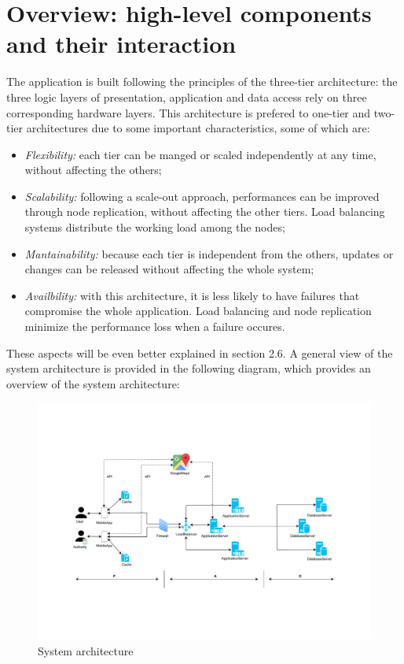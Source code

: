 \documentclass[12pt,a4paper]{report}
\begin{document}
		\section{Overview:	high-level	components	and	their	interaction}
	The application is built following the principles of the three-tier architecture: the three logic layers of presentation, 				application and data access rely on three corresponding hardware layers. This architecture is prefered to one-tier and 			two-tier architectures due to some important characteristics, some of which are:
	\begin{itemize}
	\item \emph{Flexibility:} each tier can be manged or scaled independently at any time, without affecting the others;
	\item \emph{Scalability:} following a scale-out approach, performances can be improved through node replication, without affecting the other tiers.
	Load balancing systems distribute the working load among the nodes;
	\item \emph{Mantainability:} because each tier is independent from the others, updates or changes can be released
	without affecting the whole system;
	\item \emph{Availbility:} with this architecture, it is less likely to have failures that compromise the whole application.
	Load balancing and node replication minimize the performance loss when a failure occures.
	\end{itemize}
	These aspects will be even better explained in section 2.6.
	A general view of the system architecture is provided in the following diagram, which provides an overview of the system architecture:
	\begin{figure}[H]
			\includegraphics[scale = 0.6, center]{sysarch}
			\caption{System architecture}
	\end{figure}
\end{document}

